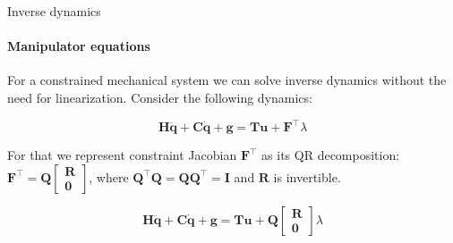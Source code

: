 \documentclass{beamer}
\begin{document}
\begin{frame}{Inverse dynamics}
\framesubtitle{Manipulator equations}
\begin{flushleft}

For a constrained mechanical system we can solve inverse dynamics without the need for linearization. Consider the following dynamics:

\begin{equation}
    \mathbf{H}\ddot{\mathbf{q}} + \mathbf{C}\dot{\mathbf{q}} + \mathbf{g} = \mathbf{T}\mathbf{u} + \mathbf{F}^\top \lambda
\end{equation}

For that we represent constraint Jacobian $\mathbf{F}^\top$ as its QR decomposition: $\mathbf{F}^\top = \mathbf{Q} \begin{bmatrix} \mathbf{R} \\ \mathbf{0}  \end{bmatrix}$, where $\mathbf{Q}^\top \mathbf{Q} = \mathbf{Q} \mathbf{Q}^\top = \mathbf{I}$ and $\mathbf{R}$ is invertible.

\begin{equation}
    \mathbf{H}\ddot{\mathbf{q}} + \mathbf{C}\dot{\mathbf{q}} + \mathbf{g} = \mathbf{T}\mathbf{u} + \mathbf{Q} \begin{bmatrix} \mathbf{R} \\ \mathbf{0}  \end{bmatrix} \lambda
\end{equation}


\end{flushleft}
\end{frame}
\end{document}
